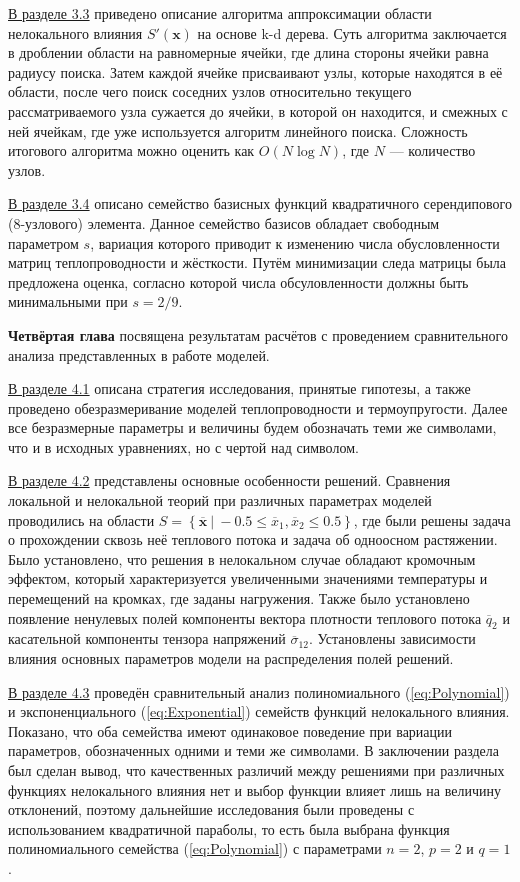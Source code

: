 \underline{В разделе 3.3} приведено описание алгоритма аппроксимации области нелокального влияния $S'(\boldsymbol{x})$ на основе k-d дерева. Суть алгоритма заключается в дроблении области на равномерные ячейки, где длина стороны ячейки равна радиусу поиска. Затем каждой ячейке присваивают узлы, которые находятся в её области, после чего поиск соседних узлов относительно текущего рассматриваемого узла сужается до ячейки, в которой он находится, и смежных с ней ячейкам, где уже используется алгоритм линейного поиска. Сложность итогового алгоритма можно оценить как $O(N \log N)$, где $N$ --- количество узлов.

\underline{В разделе 3.4} описано семейство базисных функций квадратичного серендипового (8-узлового) элемента. Данное семейство базисов обладает свободным параметром $s$, вариация которого приводит к изменению числа обусловленности матриц теплопроводности и жёсткости. Путём минимизации следа матрицы была предложена оценка, согласно которой числа обсуловленности должны быть минимальными при $s = 2/9$.

\textbf{Четвёртая глава} посвящена результатам расчётов с проведением сравнительного анализа представленных в работе моделей.

\underline{В разделе 4.1} описана стратегия исследования, принятые гипотезы, а также проведено обезразмеривание моделей теплопроводности и термоупругости. Далее все безразмерные параметры и величины будем обозначать теми же символами, что и в исходных уравнениях, но с чертой над символом.

\underline{В разделе 4.2} представлены основные особенности решений. Сравнения локальной и нелокальной теорий при различных параметрах моделей проводились на области $S = \left\{ \overline{\boldsymbol{x}} \ | \ -0.5 \leqslant \overline{x}_1, \overline{x}_2 \leqslant 0.5 \right\}$, где были решены задача о прохождении сквозь неё теплового потока и задача об одноосном растяжении. Было установлено, что решения в нелокальном случае обладают кромочным эффектом, который характеризуется увеличенными значениями температуры и перемещений на кромках, где заданы нагружения. Также было установлено появление ненулевых полей компоненты вектора плотности теплового потока $\overline{q}_2$ и касательной компоненты тензора напряжений $\overline{\sigma}_{12}$. Установлены зависимости влияния основных параметров модели на распределения полей решений.

\underline{В разделе 4.3} проведён сравнительный анализ полиномиального (\ref{eq:Polynomial}) и экспоненциального (\ref{eq:Exponential}) семейств функций нелокального влияния. Показано, что оба семейства имеют одинаковое поведение при вариации параметров, обозначенных одними и теми же символами. В заключении раздела был сделан вывод, что качественных различий между решениями при различных функциях нелокального влияния нет и выбор функции влияет лишь на величину отклонений, поэтому дальнейшие исследования были проведены с использованием квадратичной параболы, то есть была выбрана функция полиномиального семейства (\ref{eq:Polynomial}) с параметрами $n = 2$, $p = 2$ и $q = 1$.

